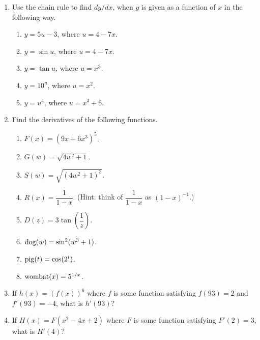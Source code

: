 \begin{enumerate}
\item Use the chain rule to find $dy/dx$, when $y$ is given as a
function of $x$ in the following way.

  \begin{enumerate}
  \item $y = 5u - 3$, where $u = 4 - 7x$.

  \item $y = \sin{u}$, where $u = 4 - 7x$.

  \item $y = \tan{u}$, where $u = x^3$.

  \item $y = 10^u$, where $u = x^2$.

  \item $y = u^4$, where $u = x^3 + 5$.



\end{enumerate}
\item Find the derivatives of the following functions.

  \begin{enumerate}
  \item $F(x) = (9x + 6x^3)^5$.

  \item $G(w) = \sqrt{4w^2 + 1}$.

  \item $S(w) = \sqrt{(4w^2 + 1)^3}$.

  \item $R(x) = \dfrac{1}{1 - x}$.  (Hint: think of $\dfrac{1}{1-x}$ as
$(1-x)^{-1}$.)


  \item $D(z) = 3 \tan \left(\dfrac{1}{z}\right)$.

  \item $\operatorname{dog}(w) = \sin ^2 (w^3+1)$.

  \item $\operatorname{pig}(t) = \cos(2^t)$.

  \item $\operatorname{wombat}(x) = 5^{1/x}$.


\end{enumerate}
\item If $h(x)= (f(x))^6$ where $f$ is some function satisfying
$f(93)=2$ and $f'(93)=-4$, what is $h'(93)$?


\item If $H(x)= F(x^2-4x+2)$ where $F$ is some function satisfying
$F'(2)=3$, what is $H'(4)$?




\end{enumerate}
